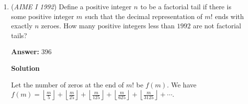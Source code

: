 \begin{enumerate}
 



\textbf{Solution 3}

As in above solutions, find $\sum_{cyc} \frac{y+z}{x}=92$ (where $O=(x:y:z)$ in barycentric coordinates). Now letting $y=z=1$ we get $\frac{2}{x}+2(x+1)=92 \implies x+\frac{1}{x}=45$, and so $\frac{2}{x}(x+1)^2=2(x+\frac{1}{x}+2)=2 \cdot 47 = 94$.

 



\textbf{Solution 4 (Ceva's Theorem)}

A consequence of Ceva's theorem sometimes attributed to Gergonne is that $\frac{AO}{OA'}=\frac{AC'}{C'B}+\frac{AB'}{B'C}$, and similarly for cevians $BB'$ and $CC'$.  Now we apply Gergonne several times and do algebra:

 
 \begin{align*} \frac{AO}{OA'}\frac{BO}{OB'}\frac{CO}{OC'} &= \left(\frac{AB'}{B'C}+\frac{AC'}{C'B}\right) \left(\frac{BC'}{C'A}+\frac{BA'}{A'C}\right)  \left(\frac{CB'}{B'A}+\frac{CA'}{A'B}\right)\\ &=\underbrace{\frac{AB'\cdot CA'\cdot BC'}{B'C\cdot A'B\cdot C'A}}_{\text{Ceva}} + \underbrace{\frac{AC'\cdot BA'\cdot CB'}{C'B\cdot A'C\cdot B'A}}_{\text{Ceva}} + \underbrace{\frac{AB'}{B'C} + \frac{AC'}{C'B}}_{\text{Gergonne}} + \underbrace{\frac{BA'}{A'C} + \frac{BC'}{C'A}}_{\text{Gergonne}} + \underbrace{\frac{CA'}{A'B} + \frac{CB'}{B'A}}_{\text{Gergonne}}\\ &= 1 + 1 + \underbrace{\frac{AO}{OA'} + \frac{BO}{OB'} + \frac{CO}{OC'}}_{92} = \boxed{94} \end{align*}




	\item (\textit{AIME I 1992}) Define a positive integer $n^{}_{}$ to be a factorial tail if there is some positive integer $m^{}_{}$ such that the decimal representation of $m!$ ends with exactly $n$ zeroes. How many positive integers less than $1992$ are not factorial tails?


 
 \textbf{Answer: }396



\textbf{Solution}

Let the number of zeros at the end of $m!$ be $f(m)$. We have $f(m) = \left\lfloor \frac{m}{5} \right\rfloor + \left\lfloor \frac{m}{25} \right\rfloor + \left\lfloor \frac{m}{125} \right\rfloor + \left\lfloor \frac{m}{625} \right\rfloor + \left\lfloor \frac{m}{3125} \right\rfloor + \cdots$. 


\end{enumerate}
